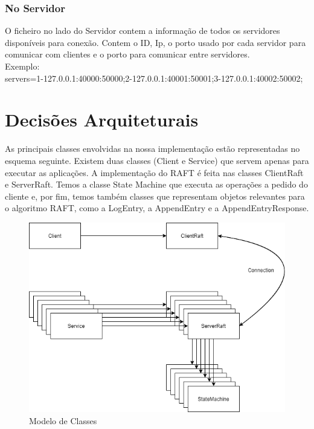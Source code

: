 \documentclass[12pt,a4paper]{report}
\begin{document}
\subsection{No Servidor}
O ficheiro no lado do Servidor contem a informação de todos os servidores disponíveis para conexão. Contem o ID, Ip, o porto usado por cada servidor para comunicar com clientes e o porto para comunicar entre servidores.\\
Exemplo: \\
servers=1-127.0.0.1:40000:50000;2-127.0.0.1:40001:50001;3-127.0.0.1:40002:50002;
\chapter{Decisões Arquiteturais}
As principais classes envolvidas na nossa implementação estão representadas no esquema seguinte. Existem duas classes (Client e Service) que servem apenas para executar as aplicações. A implementação do RAFT é feita nas classes ClientRaft e ServerRaft. Temos a classe State Machine que executa as operações a pedido do cliente e, por fim, temos também classes que representam objetos relevantes para o algoritmo RAFT, como a LogEntry, a AppendEntry e a AppendEntryResponse.  
\begin{figure}[h]
\centering
\includegraphics[scale=0.5]{Arquitetura.png} 
\caption{Modelo de Classes}
\end{figure}
\newpage
\end{document}
